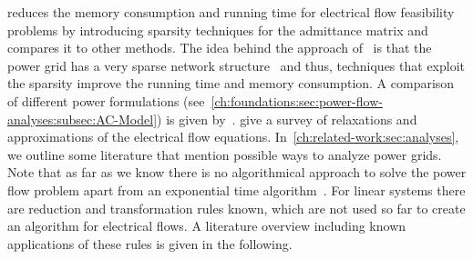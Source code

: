 \textcite{Sto74} reduces the memory consumption and running time for electrical
flow feasibility problems by introducing sparsity techniques for the admittance
matrix and compares it to other methods. The idea behind the approach
of~\citeauthor{Sto74} is that the power grid has a very sparse network
structure~\parencite[p.17]{Cai12} and thus, techniques that exploit the sparsity
improve the running time and memory consumption. A comparison of different power
formulations (see~\cref{ch:foundations:sec:power-flow-analyses:subsec:AC-Model})
is given by~\textcite{Cos08}. \textcite{Mol19} give a survey of relaxations and
approximations of the electrical flow equations.
In~\cref{ch:related-work:sec:analyses}, we outline some literature that mention
possible ways to analyze power grids. Note that as far as we know there is no
 algorithmical approach to solve the power flow problem apart
from an exponential time algorithm~\parencite{Ses61,Sha87}. For linear systems
there are reduction and transformation rules known, which are not used so far to
create an algorithm for electrical flows. A literature overview including known
applications of these rules is given in the following.
% 
% 
% 
% 
% 
